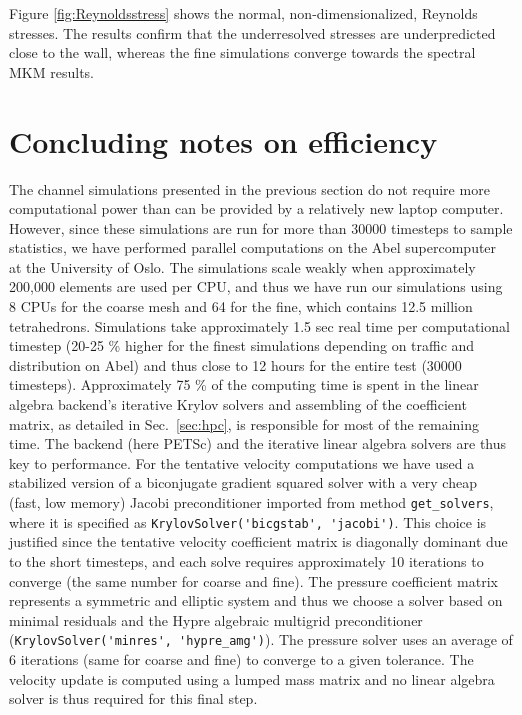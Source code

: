\documentclass[final,3p,times,twocolumn]{elsarticle}
\newcommand{\inpyth}{\lstinline[style=inlinestyle]} %[]%
\begin{document}
Figure \ref{fig:Reynoldsstress} shows the normal, non-dimensionalized, Reynolds stresses. The results confirm that the underresolved stresses are underpredicted close to the wall, whereas the fine simulations converge towards the spectral MKM results.

\section{Concluding notes on efficiency}
The channel simulations presented in the previous section do not require more computational power than can be provided by a relatively new laptop computer. However, since these simulations are run for more than 30000 timesteps to sample statistics, we have performed parallel computations on the Abel supercomputer at the University of Oslo. The simulations scale weakly when approximately 200,000 elements are used per CPU, and thus we have run our simulations using 8 CPUs for the coarse mesh and 64 for the fine, which contains 12.5 million tetrahedrons. Simulations take approximately 1.5 sec real time per computational timestep (20-25 \% higher for the finest simulations depending on traffic and distribution on Abel) and thus close to 12 hours for the entire test (30000 timesteps). Approximately 75 \% of the computing time is spent in the linear algebra backend's iterative Krylov solvers and assembling of the coefficient matrix, as detailed in Sec.~\ref{sec:hpc}, is responsible for most of the remaining time. The backend (here PETSc) and the iterative linear algebra solvers are thus key to performance. For the tentative velocity computations we have used a stabilized version of a biconjugate gradient squared solver \cite{bicgstab} with a very cheap (fast, low memory) Jacobi preconditioner imported from method \inpyth{get_solvers}, where it is specified as \inpyth{KrylovSolver('bicgstab', 'jacobi')}. This choice is justified since the tentative velocity coefficient matrix is diagonally dominant due to the short timesteps, and each solve requires approximately 10 iterations to converge (the same number for coarse and fine). The pressure coefficient matrix represents a symmetric and elliptic system and thus we choose a solver based on minimal residuals \cite{minres} and the Hypre algebraic multigrid preconditioner (\inpyth{KrylovSolver('minres', 'hypre_amg')}). The pressure solver uses an average of 6 iterations (same for coarse and fine) to converge to a given tolerance. The velocity update is computed using a lumped mass matrix and no linear algebra solver is thus required for this final step.
\end{document}
